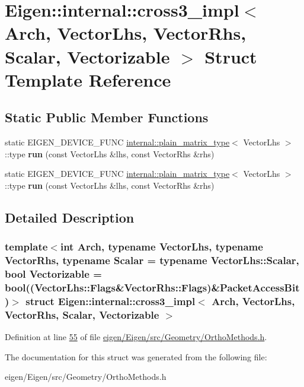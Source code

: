 \hypertarget{struct_eigen_1_1internal_1_1cross3__impl}{}\section{Eigen\+:\+:internal\+:\+:cross3\+\_\+impl$<$ Arch, Vector\+Lhs, Vector\+Rhs, Scalar, Vectorizable $>$ Struct Template Reference}
\label{struct_eigen_1_1internal_1_1cross3__impl}
\subsection*{Static Public Member Functions}
\begin{DoxyCompactItemize}
\item 
\mbox{\label{struct_eigen_1_1internal_1_1cross3__impl_a72c955c132e31e90f2455c81cf1ad62c}} 
static E\+I\+G\+E\+N\+\_\+\+D\+E\+V\+I\+C\+E\+\_\+\+F\+U\+NC \hyperlink{struct_eigen_1_1internal_1_1plain__matrix__type}{internal\+::plain\+\_\+matrix\+\_\+type}$<$ Vector\+Lhs $>$\+::type {\bfseries run} (const Vector\+Lhs \&lhs, const Vector\+Rhs \&rhs)
\item 
\mbox{\label{struct_eigen_1_1internal_1_1cross3__impl_a72c955c132e31e90f2455c81cf1ad62c}} 
static E\+I\+G\+E\+N\+\_\+\+D\+E\+V\+I\+C\+E\+\_\+\+F\+U\+NC \hyperlink{struct_eigen_1_1internal_1_1plain__matrix__type}{internal\+::plain\+\_\+matrix\+\_\+type}$<$ Vector\+Lhs $>$\+::type {\bfseries run} (const Vector\+Lhs \&lhs, const Vector\+Rhs \&rhs)
\end{DoxyCompactItemize}


\subsection{Detailed Description}
\subsubsection*{template$<$int Arch, typename Vector\+Lhs, typename Vector\+Rhs, typename Scalar = typename Vector\+Lhs\+::\+Scalar, bool Vectorizable = bool((\+Vector\+Lhs\+::\+Flags\&\+Vector\+Rhs\+::\+Flags)\&\+Packet\+Access\+Bit)$>$\newline
struct Eigen\+::internal\+::cross3\+\_\+impl$<$ Arch, Vector\+Lhs, Vector\+Rhs, Scalar, Vectorizable $>$}



Definition at line \hyperlink{eigen_2_eigen_2src_2_geometry_2_ortho_methods_8h_source_l00055}{55} of file \hyperlink{eigen_2_eigen_2src_2_geometry_2_ortho_methods_8h_source}{eigen/\+Eigen/src/\+Geometry/\+Ortho\+Methods.\+h}.



The documentation for this struct was generated from the following file\+:\begin{DoxyCompactItemize}
\item 
eigen/\+Eigen/src/\+Geometry/\+Ortho\+Methods.\+h\end{DoxyCompactItemize}
